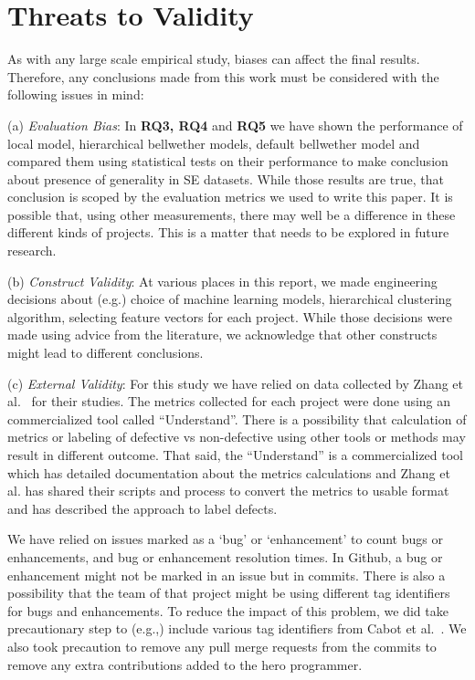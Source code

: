 \documentclass[10pt,journal,compsoc]{IEEEtran}
\begin{document}
\section{Threats to Validity}
\label{sec:validity}

As with any large scale empirical study, biases can affect the final
results. Therefore, any conclusions made from this work
must be considered with the following issues in mind:

(a) \textit{Evaluation Bias}: 
In  {\bf  RQ3, RQ4} and {\bf RQ5} we have shown the performance of local model, hierarchical bellwether models, default bellwether model and compared them using statistical tests on their performance to make conclusion about presence of generality in SE datasets. While those results are true, that conclusion is scoped by the evaluation metrics we used to write this paper. It is possible that, using other measurements, there may well be a difference in these different kinds of projects. This is a matter that needs to be explored in future research.  

    
(b) \textit{Construct Validity}: At various places in this report, we made engineering decisions about (e.g.) choice of machine learning models, hierarchical clustering algorithm, selecting feature vectors for each project. While those decisions were made using advice from the literature, we acknowledge that other constructs might lead to different conclusions. 

(c) \textit{External Validity}: For this study we have relied on data collected by Zhang et al.~\cite{zhang15} for their studies. The metrics collected for each project were done using an commercialized tool called ``Understand''. There is a possibility that calculation of metrics or labeling of defective vs non-defective using other tools or methods may result in different outcome. That said, the ``Understand'' is a commercialized tool which has detailed documentation about the metrics calculations and Zhang et al. has shared their scripts and process to convert the metrics to usable format and has described the approach to label defects.  

We have relied on issues marked as a `bug' or `enhancement' to count bugs or enhancements, and bug or enhancement resolution times. In Github, a bug or enhancement might not be marked in an issue but in commits. There is also a possibility that the team of that project might be using different tag identifiers for bugs and enhancements. To reduce the impact of this problem, we  did take precautionary step to (e.g.,) include various tag identifiers from Cabot et al.~\cite{cabot2015exploring}. We also took precaution to remove any pull merge requests from the commits to remove any extra contributions added to the hero programmer. 
\end{document}
